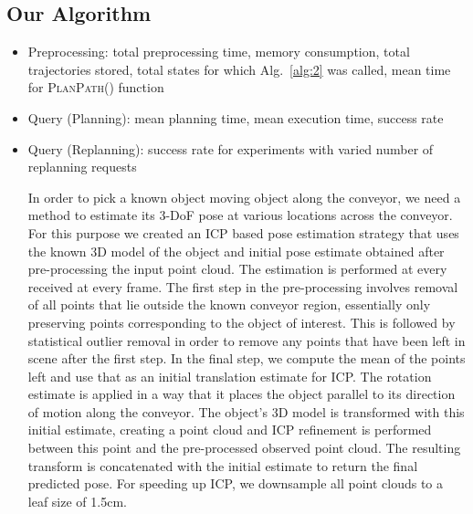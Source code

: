 \subsection*{Our Algorithm}
\begin{itemize}
    \item Preprocessing: total preprocessing time, memory consumption, total trajectories stored, total states for which Alg.~\ref{alg:2} was called, mean time for \textsc{PlanPath}() function 
    \item Query (Planning): mean planning time, mean execution time, success rate 
    \item Query (Replanning): success rate for experiments with varied number of replanning requests

In order to pick a known object moving object along the conveyor, we need a method to estimate its 3-DoF pose at various locations across the conveyor. For this purpose we created an ICP based pose estimation strategy that uses the known 3D model of the object and initial pose estimate obtained after pre-processing the input point cloud. The estimation is performed at every received at every frame. The first step in the pre-processing involves removal of all points that lie outside the known conveyor region, essentially only preserving points corresponding to the object of interest. This is followed by statistical outlier removal in order to remove any points that have been left in scene after the first step. In the final step, we compute the mean of the points left and use that as an initial translation estimate for ICP. The rotation estimate is applied in a way that it places the object parallel to its direction of motion along the conveyor. The object’s 3D model is transformed with this initial estimate, creating a point cloud and ICP refinement is performed between this point and the pre-processed observed point cloud. The resulting transform is concatenated with the initial estimate to return the final predicted pose. For speeding up ICP, we downsample all point clouds to a leaf size of 1.5cm.
\end{itemize}